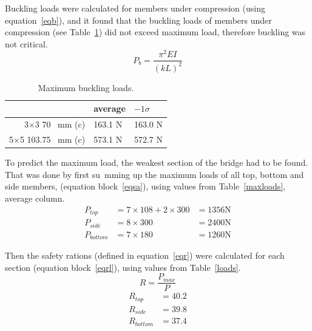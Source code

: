 \documentclass[12pt]{article}
\begin{document}
		Buckling loads were calculated for members under compression (using equation~\ref{eqb}), and it found that the buckling loads of members under compression (see Table~\ref{buck}) did not exceed maximum load, therefore buckling was not critical.
		\begin{equation}
			P_b=\frac{\pi^2 E I}{(kL)^2}
			\label{eqb}
		\end{equation}
		\begin{table}[h!]
			\caption{Maximum buckling loads.}
			\begin{center}
			\begin{tabular}{ | r | l | l | }
				\hline
				& average & $-1\sigma$ \\ \hline
				3$\times$3 70 ~mm (c) & 163.1 N & 163.0 N \\ \hline
				5$\times$5 103.75 ~mm (c) & 573.1 N & 572.7 N \\ \hline
			\end{tabular}
			\end{center}
			\label{buck}
		\end{table}

		To predict the maximum load, the weakest section of the bridge had to be found. That was done by first su~mming up the maximum loads of all top, bottom and side members, (equation block~\ref{eqsa}), using values from Table~\ref{maxloads}, average column.
		\begin{subequations}
			\begin{align}
				P_{top}&=7\times108+2\times300
				&=1356\mathrm{N}\\
				P_{side}&=8\times300
				&=2400\mathrm{N}\\
				P_{bottom}&=7\times180
				&=1260\mathrm{N}
			\end{align}
			\label{eqsa}
		\end{subequations}

		Then the safety rations (defined in equation~\ref{eqr}) were calculated for each section (equation block~\ref{eqrl}), using values from Table~\ref{loads}.
		\begin{equation}
			R=\frac{P_{max}}{P}
			\label{eqr}
		\end{equation}
		\begin{subequations}
			\begin{align}
				R_{top}&=40.2\\
				R_{side}&=39.8\\
				R_{bottom}&=37.4
			\end{align}
			\label{eqrl}
		\end{subequations}
\end{document}
